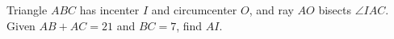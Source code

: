 Triangle $ABC$ has incenter $I$ and circumcenter $O$, and ray $AO$ bisects $\angle IAC$. Given $AB+AC=21$ and $BC=7$, find $AI$.
